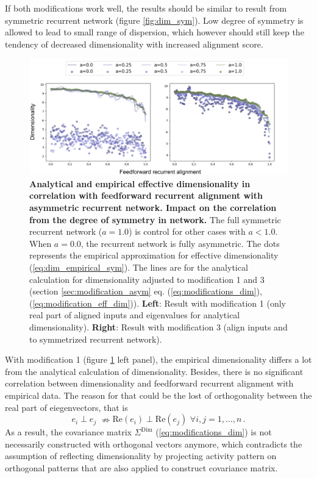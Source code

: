 \documentclass[11pt]{article}
\begin{document}
	If both modifications work well, the results should be similar to result from symmetric recurrent network (figure \ref{fig:dim_sym}). Low degree of symmetry is allowed to lead to small range of dispersion, which however should still keep the tendency of decreased dimensionality with increased alignment score. %
		\begin{figure} [H]
			\centering
			\includegraphics[width=\textwidth]{../figures/dim_asym.pdf}
			\caption{\textbf{Analytical and empirical effective dimensionality in correlation with feedforward recurrent alignment with asymmetric recurrent network. Impact on the correlation from the degree of symmetry in network.} The full symmetric recurrent network ($a = 1.0$) is control for other cases with $a < 1.0$. When $a = 0.0$, the recurrent network is fully asymmetric. The dots represents the empirical approximation for effective dimensionality (\ref{eq:dim_empirical_sym}). The lines are for the analytical calculation for dimensionality adjusted to modification 1 and 3 (section \ref{sec:modification_asym} eq. (\ref{eq:modifications_dim}), (\ref{eq:modification_eff_dim})). \textbf{Left}: Result with modification 1 (only real part of aligned inputs and eigenvalues for analytical dimensionality). \textbf{Right}: Result with modification 3 (align inputs and to symmetrized recurrent network).}
			\label{fig:dim_asym}
		\end{figure}
	With modification 1 (figure \ref{fig:dim_asym} left panel), the empirical dimensionality differs a lot from the analytical calculation of dimensionality. Besides, there is no significant correlation between dimensionality and feedforward recurrent alignment with empirical data. The reason for that could be the lost of orthogonality between the real part of eiegenvectors, that is 
		\begin{equation}
			e_i \perp e_j  \, \, \nRightarrow \text{Re}(e_i) \perp \text{Re}(e_j) \, \, \forall i, j = 1, ..., n \, .
		\end{equation}
	As a result, the covariance matrix $\Sigma^{\text{Dim}}$ (\ref{eq:modifications_dim}) is not necessarily constructed with orthogonal vectors anymore, which contradicts the assumption of reflecting dimensionality by projecting activity pattern on orthogonal patterns that are also applied to construct covariance matrix. 
	
\end{document}
